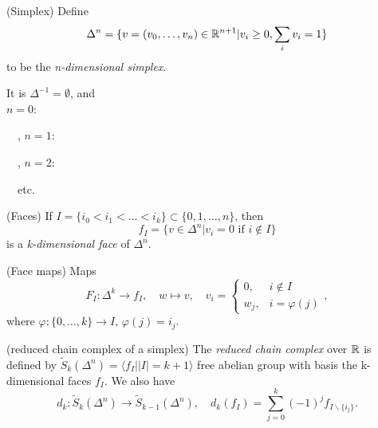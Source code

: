 \documentclass[a4paper,11pt]{article}
\begin{document}
			\begin{defi}(Simplex)
				Define \begin{equation}
					\Delta^{n}=\{ v=(v_0,\dots,v_n)\in\mathbb{R}^{n+1}|v_i\ge 0,\sum_iv_i=1\}
				\end{equation}
				to be the \textit{n-dimensional simplex}.
			\end{defi}

			\begin{eg}
				It is $\Delta^{-1}=\emptyset$, and\\ $n=0$: \ \ 
				\ \ , $n=1$:
				\ \ , $n=2$:
				\ \ \hspace{1cm}etc.
			\end{eg}

			\begin{defi}(Faces)
				If $I=\{i_0<i_1<\dots<i_k\}\subset \{0,1,\dots,n\}$, then \begin{equation}
					f_I=\{v\in\Delta^{n}|v_i=0\text{ if }i\notin I\}
				\end{equation} is a \textit{k-dimensional face} of $\Delta^{n}$.
			\end{defi}

			\begin{defi}(Face maps)
				Maps \begin{equation}
					F_I:\Delta^{k}\rightarrow f_I,\quad w\mapsto v,\quad v_i=\begin{cases}
						0, & i\notin I\\w_j, & i=\varphi(j)
					\end{cases},
				\end{equation}
				where $\varphi:\{0,\dots,k\}\rightarrow I,\,\varphi(j)=i_j$.
			\end{defi}

			\begin{defi}(reduced chain complex of a simplex)\label{def--2.6}
				The \textit{reduced chain complex} over $\mathbb{R}$ is defined by $\tilde{S}_k (\Delta^{n})=\langle f_I||I|=k+1\rangle$ free abelian group with basis the k-dimensional faces $f_I$. We also have
				\begin{equation}
					d_{k}:\tilde{S}_{k}(\Delta^{n})\rightarrow\tilde{S}_{k-1}(\Delta^{n}),\quad d_{k}(f_I)=\sum_{j=0}^{k}(-1)^{j}f_{I\backslash\{i_j\}}. 
				\end{equation}
			\end{defi}
\end{document}

